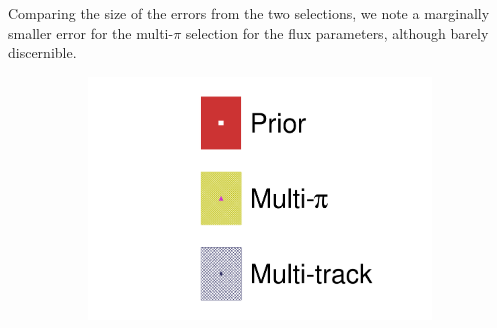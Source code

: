 Comparing the size of the errors from the two selections, we note a marginally smaller error for the multi-$\pi$ selection for the flux parameters, although barely discernible.
\begin{figure}[h]
	\centering
	\begin{subfigure}[t]{0.10\textwidth}
		\includegraphics[width=\textwidth,page=1, trim={0mm 0mm 0mm 9mm}, clip]{figures/mach3/2018/asimov/2018a_FixedCov_RedCov_Mpi_Asimov_merg_2018a_NewDetMatrix_OrderSwitched_Data2to8_merge}
	\end{subfigure}
	

\end{figure}
